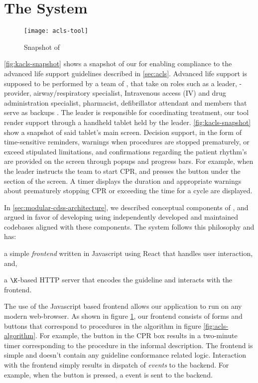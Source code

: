 \section{The \KACLS{} System}\label{sec:kacls-cdss}

\begin{figure}[t!]
  \centering
  \texttt{[image: acls-tool]}
  \caption{Snapshot of \KACLS{}}\label{fig:kacls-snapshot}
\end{figure}

\autoref{fig:kacls-snapshot} shows a snapshot of our \CDSS{} for
enabling compliance to the advanced life support guidelines described in
\autoref{sec:acls}. Advanced life support is supposed to be performed by
a team of \HCPs{}, that take on roles such as a leader, \CPR{}-provider,
airway/respiratory specialist, Intravenous access (IV) and drug administration
specialist, pharmacist, defibrillator attendant and members that serve as
backups \cite{ACLSWikiEntry}. The leader is responsible for coordinating
treatment, our tool render support through a handheld tablet held by the leader.
\autoref{fig:kacls-snapshot} show a snapshot of said tablet's main screen.
Decision support, in the form of time-sensitive reminders, warnings when
procedures are stopped prematurely, or exceed stipulated limitations, and
confirmations regarding the patient rhythm's are provided on the screen
through popups and progress bars. For example, when the leader instructs
the team to start CPR, and presses the  button under the 
section of the screen. A timer displays the duration and appropriate warnings
about prematurely stopping CPR or exceeding the time for a \CPR{} cycle are
displayed.

In \autoref{sec:modular-cdss-architecture}, we described
conceptual components of \CDSSs{}, and argued in favor
of developing \CDSSs{} using independently developed and maintained codebases
aligned with these components. The \KACLS{} system follows
this philosophy and has:
\begin{enumerate*}[label=(\roman*)]
  \item a simple \emph{frontend} written in Javascript using React \cite{ReactJSUrl} that handles
    user interaction, and,
  \item a $\K$-based HTTP server that encodes the \ACLS{} guideline
    and interacts with the frontend.
\end{enumerate*}
The use of the Javascript based frontend allows our application
to run on any modern web-browser. As shown in figure \ref{fig:kacls-snapshot},
our frontend consists of forms and buttons that correspond to procedures
in the algorithm in figure \ref{fig:acls-algorithm}. For example, the
 button in the CPR box results in a two-minute timer corresponding
to the  procedure in the informal description.
The frontend is simple and doesn't contain any guideline conformance related
logic. Interaction with the frontend simply results in dispatch of
\textit{events} to the backend. For example, when the  button is pressed, a
 event is sent to the backend.


